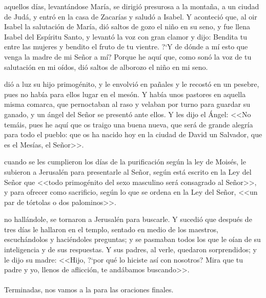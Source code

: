 \documentclass[10pt,twoside]{book}
\begin{document}
\noindent{}
\vspace{2mm}
aquellos días, levantándose María, se dirigió presurosa a la montaña, a un ciudad de Judá, y entró en la casa de Zacarías y saludó a Isabel.
Y aconteció que, al oir Isabel la salutación de María, dió saltos de gozo el niño en su seno, y fue llena Isabel del Espíritu Santo, y levantó la voz con gran clamor y dijo:
Bendita tu entre las mujeres y bendito el fruto de tu vientre. {?`}Y de dónde a mí esto que venga la madre de mi Señor a mí? Porque he aquí que, como sonó la voz de tu salutación en mi oídos,
dió saltos de alborozo el niño en mi seno.\\[2mm]

\vspace{5mm}

\noindent{}
\vspace{2mm}
\space dió a luz su hijo primogénito, y le envolvió en pañales y le recostó en un pesebre, pues no había para ellos lugar en el mesón.
Y había unos pastores en aquella misma comarca, que pernoctaban al raso y velaban por turno para guardar su ganado, y un ángel del Señor se presentó ante ellos.
Y les dijo el Ángel: <<No temáis, pues he aquí que os traigo una buena nueva, que será de grande alegría para todo el pueblo: 
que os ha nacido hoy en la ciudad de David un Salvador, que es el Mesías, el Señor>>.\\[2mm]

\vspace{5mm}

\noindent{}
\vspace{2mm}
\space cuando se les cumplieron los días de la purificación según la ley de Moisés, le subieron a Jerusalén para presentarle al Señor,
según está escrito en la Ley del Señor que <<todo primogénito del sexo masculino será consagrado al Señor>>, y para ofrecer como sacrificio,
según lo que se ordena en la Ley del Señor, <<un par de tórtolas o dos palominos>>.\\[2mm]

\vspace{5mm}

\noindent{}
\vspace{2mm}
\space no hallándole, se tornaron a Jerusalén para buscarle. Y sucedió que después de tres días le hallaron en el templo,
sentado en medio de los maestros, escuchándolos y haciéndoles preguntas; y se pasmaban todos los que le oían de su inteligencia y de sus respuestas.
Y sus padres, al verle, quedaron sorprendidos; y le dijo su madre: <<Hijo, {?`}por qué lo hiciste así con nosotros? Mira que tu padre y yo, llenos de aflicción, 
te andábamos buscando>>.\\[2mm]
{}\\
Terminadas, nos vamos a la  para las oraciones finales.\\[5mm]
\end{document}
